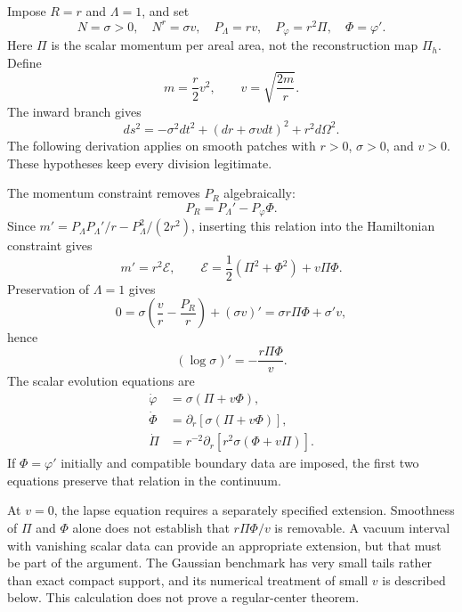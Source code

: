 Impose $R=r$ and $\Lambda=1$, and set
\begin{equation}
 N=\sigma>0,\quad N^r=\sigma v,\quad
 P_\Lambda=rv,\quad P_\varphi=r^2\Pi,\quad \Phi=\varphi'.
\end{equation}
Here $\Pi$ is the scalar momentum per areal area, not the reconstruction map $\Pi_h$. Define
\begin{equation}
 m=\frac r2v^2,\qquad v=\sqrt{\frac{2m}{r}}.
\end{equation}
The inward branch gives
\begin{equation}
 ds^2=-\sigma^2dt^2+(dr+\sigma vdt)^2+r^2d\Omega^2.
\label{c:strong:scalar-metric}
\end{equation}
The following derivation applies on smooth patches with $r>0$, $\sigma>0$, and $v>0$. These hypotheses keep every division legitimate.

The momentum constraint removes $P_R$ algebraically:
\begin{equation}
 P_R=P_\Lambda'-P_\varphi\Phi.
\end{equation}
Since $m'=P_\Lambda P_\Lambda'/r-P_\Lambda^2/(2r^2)$, inserting this relation into the Hamiltonian constraint gives
\begin{equation}
 m'=r^2\mathcal E,\qquad
 \mathcal E=\frac12(\Pi^2+\Phi^2)+v\Pi\Phi.
\label{c:strong:scalar-mass}
\end{equation}
Preservation of $\Lambda=1$ gives
\begin{equation}
 0=\sigma\left(\frac vr-\frac{P_R}r\right)+(\sigma v)'
   =\sigma r\Pi\Phi+\sigma'v,
\end{equation}
hence
\begin{equation}
 (\log\sigma)'=-\frac{r\Pi\Phi}{v}.
\label{c:strong:scalar-lapse}
\end{equation}
The scalar evolution equations are
\begin{align}
 \dot\varphi&=\sigma(\Pi+v\Phi),\\
 \dot\Phi&=\partial_r[\sigma(\Pi+v\Phi)],\\
 \dot\Pi&=r^{-2}\partial_r[r^2\sigma(\Phi+v\Pi)].
\label{c:strong:scalar-evolution}
\end{align}
If $\Phi=\varphi'$ initially and compatible boundary data are imposed, the first two equations preserve that relation in the continuum.

At $v=0$, the lapse equation requires a separately specified extension. Smoothness of $\Pi$ and $\Phi$ alone does not establish that $r\Pi\Phi/v$ is removable. A vacuum interval with vanishing scalar data can provide an appropriate extension, but that must be part of the argument. The Gaussian benchmark has very small tails rather than exact compact support, and its numerical treatment of small $v$ is described below. This calculation does not prove a regular-center theorem.

